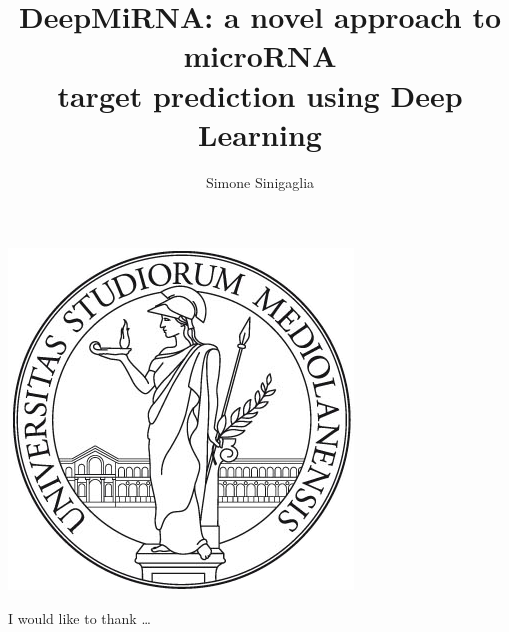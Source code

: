 \documentclass[
12pt, %
english, %
]{report} %
\begin{document}
	
	\title{DeepMiRNA: a novel approach to microRNA \\ 
		target prediction using Deep Learning}
	\author{Simone Sinigaglia}
	
	\begin{center}
		\includegraphics{Figures/logo_unimi}\\[1cm]
	\end{center}
	
	\beforepreface
	I would like to thank \dots
	\afterpreface
	
	
	
%
%

	
	
	
	
	
	
%
%
	
	\appendix %
	

%

	
	

\end{document}
